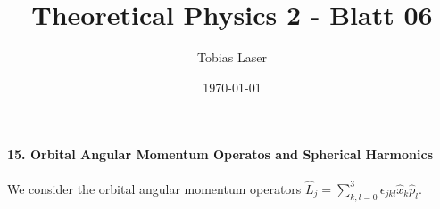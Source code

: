 \documentclass[11pt,a4paper]{scrartcl}
\begin{document}
    \title{Theoretical Physics 2 - Blatt 06}
    \author{Tobias Laser}
    \date{\today}
    \maketitle
    \vfill
    \thispagestyle{empty}


    \paragraph{15. Orbital Angular Momentum Operatos and Spherical Harmonics} 

        We consider the orbital angular momentum operators $\hat{L}_j = \sum\limits_{k, l = 0}^3 \epsilon_{jkl} \hat{x}_k \hat{p}_l$.
\end{document}
